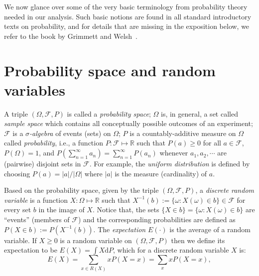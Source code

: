 
We now glance over some of the very basic terminology from probability
theory needed in our analysis.  Such basic notions are found in all
standard introductory texts on probability, and for details that are
missing in the exposition below, we refer to the book by Grimmett and
Welsh~\cite{2014GrimmettG_WelshD-aa}.

\section{Probability space and random variables}
A triple $(\Omega, \mathcal{F}, P)$ is called a \emph{probability
  space}; $\Omega$ is, in general, a set called \emph{sample space}
which contains all conceptually possible outcomes of an experiment;
$\mathcal{F}$ is a \emph{$\sigma$-algebra} of events (sets) on
$\Omega$; $P$ is a countably-additive measure on $\Omega$ called
\emph{probability}, i.e., a function
$P: \mathcal{F} \mapsto \mathbb{R}$ such that $P(a) \geq 0$ for all
$a \in \mathcal{F}$, $P(\Omega) = 1$, and
$P(\sum_{n=1}^{\infty}a_n) = \sum_{n=1}^{\infty} P(a_n)$ whenever
$a_1, a_2, \cdots$ are (pairwise) disjoint sets in $\mathcal{F}$.  For
example, the \emph{uniform distribution} is defined by choosing
$P(a) = |a|/|\Omega|$ where $|a|$ is the measure (cardinality) of $a$.

Based on the probability space, given by the triple $(\Omega,
\mathcal{F}, P)$, a \emph{discrete random variable} is a function $X:
\Omega \mapsto \mathbb{R}$ such that $X^{-1}(b) := \{ \omega:
X(\omega) \in b \} \in \mathcal{F}$ for every set $b$ in the image of
$X$.
Notice that, the sets $\{ X \in b \} = \{ \omega: X(\omega) \in b \} $
are ``events'' (members of $\mathcal{F}$) and the corresponding
probabilities are defined as $ P(X \in b) := P(X^{-1}(b))$.
The \emph{expectation} $E(\cdot)$ is the average of a random variable. If
$X \geq 0$ is a random variable on $(\Omega, \mathcal{F}, P)$ then we
define its expectation to be $E(X) = \int X \mathrm{d} P$, which for
a discrete random variable $X$ is:
\begin{equation}
E(X) = \sum_{x \in R(X)} x P(X=x) = \sum_{x} x P(X=x),
\end{equation}

